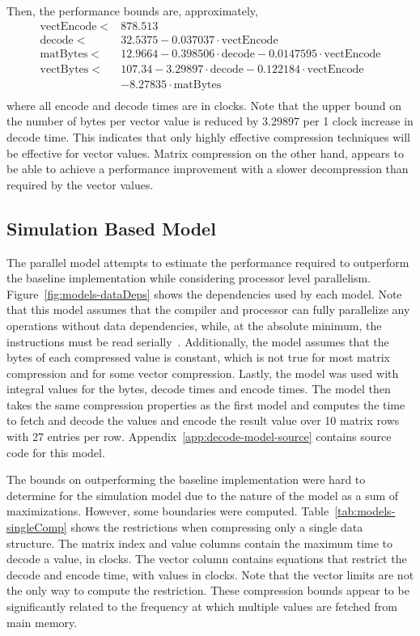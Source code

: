 Then, the performance bounds are, approximately,
\begin{align*}
\mathrm{vectEncode} <& 878.513 \\
\mathrm{decode} <& 32.5375 - 0.037037\cdot\mathrm{vectEncode} \\
\mathrm{matBytes} <& 12.9664 - 0.398506\cdot\mathrm{decode}- 0.0147595\cdot\mathrm{vectEncode}\\
\mathrm{vectBytes} <& 107.34  - 3.29897\cdot\mathrm{decode} - 0.122184\cdot\mathrm{vectEncode} \\
	&- 8.27835\cdot\mathrm{matBytes}\\
\end{align*}
where all encode and decode times are in clocks.
Note that the upper bound on the number of bytes per vector value is reduced by 3.29897 per 1 clock increase in decode time.
This indicates that only highly effective compression techniques will be effective for vector values.
Matrix compression on the other hand, appears to be able to achieve a performance improvement with a slower decompression than required by the vector values.

\subsection{Simulation Based Model}
The parallel model attempts to estimate the performance required to outperform the baseline implementation while considering processor level parallelism.
Figure~\ref{fig:models-dataDeps} shows the dependencies used by each model.
Note that this model assumes that the compiler and processor can fully parallelize any operations without data dependencies, while, at the absolute minimum, the instructions must be read serially~\cite{Hennessy:1990:ComputerArchitecture}.
Additionally, the model assumes that the bytes of each compressed value is constant, which is not true for most matrix compression and for some vector compression.
Lastly, the model was used with integral values for the bytes, decode times and encode times.
The model then takes the same compression properties as the first model and computes the time to fetch and decode the values and encode the result value over 10 matrix rows with 27 entries per row.
Appendix~\ref{app:decode-model-source} contains source code for this model.

The bounds on outperforming the baseline implementation were hard to determine for the simulation model due to the nature of the model as a sum of maximizations.
However, some boundaries were computed.
Table~\ref{tab:models-singleComp} shows the restrictions when compressing only a single data structure.
The matrix index and value columns contain the maximum time to decode a value, in clocks.
The vector column contains equations that restrict the decode and encode time, with values in clocks.
Note that the vector limits are not the only way to compute the restriction.
These compression bounds appear to be significantly related to the frequency at which multiple values are fetched from main memory.

